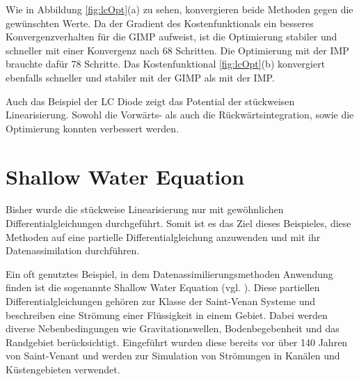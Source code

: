 Wie in Abbildung \ref{fig:lcOpt}(a) zu sehen, konvergieren beide Methoden gegen die gewünschten Werte. Da der Gradient des Kostenfunktionals ein besseres Konvergenzverhalten für die GIMP aufweist, ist die Optimierung stabiler und schneller mit einer Konvergenz nach 68 Schritten. Die Optimierung mit der IMP brauchte dafür 78 Schritte.  Das Kostenfunktional \ref{fig:lcOpt}(b) konvergiert ebenfalls schneller und stabiler mit der GIMP als mit der IMP.

Auch das Beispiel der LC Diode zeigt das Potential der stückweisen Linearisierung. Sowohl die Vorwärts- als auch die Rückwärtsintegration, sowie die Optimierung konnten verbessert werden.%
\section{Shallow Water Equation}
Bisher wurde die stückweise Linearisierung nur mit gewöhnlichen Differentialgleichungen durchgeführt. Somit ist es das Ziel dieses Beispieles, diese Methoden auf eine partielle Differentialgleichung anzuwenden und mit ihr Datenassimilation durchführen.

Ein oft genutztes Beispiel, in dem Datenassimilierungsmethoden Anwendung finden ist die sogenannte Shallow Water Equation (vgl. \cite{zou,navon}). 
Diese partiellen Differentialgleichungen gehören zur Klasse der Saint-Venan Systeme und beschreiben eine Strömung einer Flüssigkeit in einem Gebiet. Dabei werden diverse Nebenbedingungen wie Gravitationswellen, Bodenbegebenheit und das Randgebiet berücksichtigt. Eingeführt wurden diese bereits vor über 140 Jahren von Saint-Venant \cite{saint1871theorie} und werden zur Simulation von Strömungen in Kanälen und Küstengebieten verwendet.

